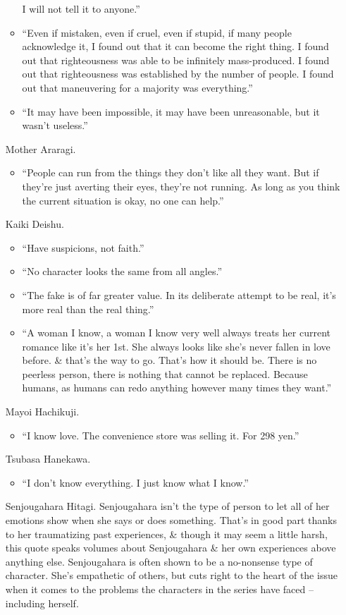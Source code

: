 \documentclass{article}
\begin{document}
\begin{enumerate}
\begin{itemize}
    	I will not tell it to anyone.''
    	\item ``Even if mistaken, even if cruel, even if stupid, if many people acknowledge it, I found out that it can become the right thing. I found out that righteousness was able to be infinitely mass-produced. I found out that righteousness was established by the number of people. I found out that maneuvering for a majority was everything.''
    	\item ``It may have been impossible, it may have been unreasonable, but it wasn't useless.''
    \end{itemize}
    {\sf Mother Araragi.}
    \begin{itemize}
    	\item ``People can run from the things they don't like all they want. But if they're just averting their eyes, they're not running. As long as you think the current situation is okay, no one can help.''
    \end{itemize}
    {\sf Kaiki Deishu.}
    \begin{itemize}
    	\item ``Have suspicions, not faith.''
    	\item ``No character looks the same from all angles.''
    	\item ``The fake is of far greater value. In its deliberate attempt to be real, it's more real than the real thing.''
    	\item ``A woman I know, a woman I know very well always treats her current romance like it's her 1st. She always looks like she's never fallen in love before. \& that's the way to go. That's how it should be. There is no peerless person, there is nothing that cannot be replaced. Because humans, as humans can redo anything however many times they want.''
    \end{itemize}
    {\sf Mayoi Hachikuji.}
    \begin{itemize}
    	\item ``I know love. The convenience store was selling it. For 298 yen.''
    \end{itemize}
    {\sf Tsubasa Hanekawa.}
    \begin{itemize}
    	\item ``I don't know everything. I just know what I know.''
    \end{itemize}
    {\sf Senjougahara Hitagi.} Senjougahara isn't the type of person to let all of her emotions show when she says or does something. That's in good part thanks to her traumatizing past experiences, \& though it may seem a little harsh, this quote speaks volumes about Senjougahara \& her own experiences above anything else. Senjougahara is often shown to be a no-nonsense type of character. She's empathetic of others, but cuts right to the heart of the issue when it comes to the problems the characters in the series have faced -- including herself.

\end{enumerate}
\end{document}
